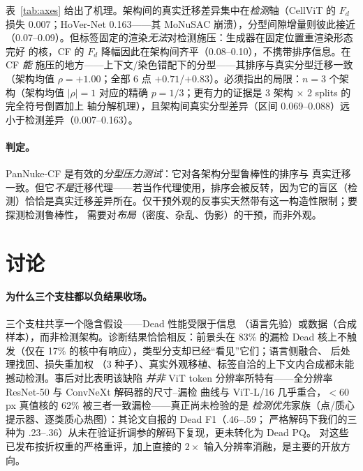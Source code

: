 \documentclass[11pt]{article}
\begin{document}
表~\ref{tab:axes} 给出了机理。架构间的真实迁移差异集中在\emph{检测}轴（CellViT 的
$F_d$ 损失 0.007；HoVer-Net 0.163——其 MoNuSAC 崩溃），分型间隙增量则彼此接近
（0.07--0.09）。但标签固定的渲染\emph{无法}对检测施压：生成器在固定位置重渲染形态完好
的核，CF 的 $F_d$ 降幅因此在架构间齐平（0.08--0.10），不携带排序信息。在 CF \emph{能}
施压的地方——上下文/染色错配下的分型——其排序与真实分型迁移一致（架构均值
$\rho=+1.00$；全部 6 点 $+0.71$/$+0.83$）。必须指出的局限：$n=3$ 个架构（架构均值
$|\rho|=1$ 对应的精确 $p=1/3$；更有力的证据是 3 架构 $\times$ 2 splits 的完全符号倒置加上
轴分解机理），且架构间真实分型差异（区间 0.069--0.088）远小于检测差异（0.007--0.163）。

\paragraph{判定。}PanNuke-CF 是有效的\emph{分型压力测试}：它对各架构分型鲁棒性的排序与
真实迁移一致。但它\emph{不是}迁移代理——若当作代理使用，排序会被反转，因为它的盲区（检
测）恰恰是真实迁移差异所在。仅干预外观的反事实天然带有这一构造性限制；要探测检测鲁棒性，
需要对\emph{布局}（密度、杂乱、伪影）的干预，而非外观。

\section{讨论}
\label{sec:discussion}

\paragraph{为什么三个支柱都以负结果收场。}三个支柱共享一个隐含假设——Dead 性能受限于信息
（语言先验）或数据（合成样本），而非检测架构。诊断结果恰恰相反：前景头在 83\%
的漏检 Dead 核上不触发（仅在 17\% 的核中有响应），类型分支却已经“看见”它们；语言侧融合、
后处理找回、损失重加权
（3 种子）、真实外观移植、标签自洽的上下文内合成都未能撼动检测。事后对比表明该缺陷
\emph{并非} ViT token 分辨率所特有——全分辨率 ResNet-50 与 ConvNeXt 解码器的尺寸--漏检
曲线与 ViT-L/16 几乎重合，$<$60\,px 真值核的 62\% 被三者一致漏检——真正尚未检验的是
\emph{检测优先}家族（点/质心提示器、逐类质心热图）：其论文自报的 Dead F1（.46--.59；
严格解码下我们的三种为 .23--.36）从未在验证折调参的解码下复现，更未转化为 Dead PQ。
对这些已发布按折权重的严格重评，加上直接的 $2\times$ 输入分辨率消融，是主要的开放方向。
\end{document}
